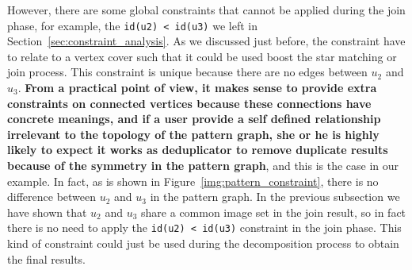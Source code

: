 However, there are some global constraints that cannot be applied during the join phase,
for example, the \texttt{id(u2) < id(u3)} we left in Section~\ref{sec:constraint_analysis}.
As we discussed just before, the constraint have to relate to a vertex cover such that it could be used boost the star matching or join process.
This constraint is unique because there are no edges between $u_2$ and $u_3$.
\textbf{From a practical point of view,
it makes sense to provide extra constraints on connected vertices because these connections have concrete meanings,
and if a user provide a self defined relationship irrelevant to the topology of the pattern graph, she or he is highly likely to expect it works as deduplicator to remove duplicate results because of the symmetry in the pattern graph},
and this is the case in our example.
In fact, as is shown in Figure~\ref{img:pattern_constraint}, there is no difference between $u_2$ and $u_3$ in the pattern graph.
In the previous subsection we have shown that $u_2$ and $u_3$ share a common image set in the join result,
so in fact there is no need to apply the \texttt{id(u2) < id(u3)} constraint in the join phase.
This kind of constraint could just be used during the decomposition process to obtain the final results.
